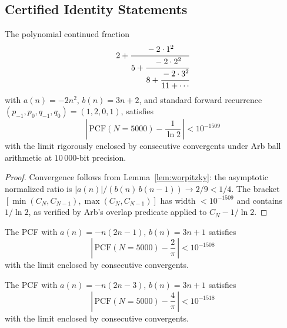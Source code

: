 
\subsection{Certified Identity Statements}

\begin{theorem}[Certified Log Family, $k=2$]\label{thm:ln2}
The polynomial continued fraction
\[
  2 + \cfrac{-2 \cdot 1^2}{5 + \cfrac{-2 \cdot 2^2}{8 + \cfrac{-2 \cdot 3^2}{11 + \cdots}}}
\]
with $a(n) = -2n^2$, $b(n) = 3n + 2$, and standard forward recurrence
$(p_{-1}, p_0, q_{-1}, q_0) = (1, 2, 0, 1)$, satisfies
\[
  \left|\, \mathrm{PCF}(N{=}5000) - \frac{1}{\ln 2}\, \right|
  < 10^{-1509}
\]
with the limit rigorously enclosed by consecutive convergents under
Arb ball arithmetic at $10\,000$-bit precision.
\end{theorem}

\begin{proof}
Convergence follows from Lemma~\ref{lem:worpitzky}: the asymptotic
normalized ratio is $|a(n)|/(b(n)\,b(n{-}1)) \to 2/9 < 1/4$.
The bracket $[\min(C_N, C_{N-1}), \max(C_N, C_{N-1})]$ has width
$< 10^{-1509}$ and contains $1/\ln 2$,
as verified by Arb's overlap predicate applied to $C_N - 1/\ln 2$.
\end{proof}

\begin{theorem}[Certified Pi Family, $m=0$]\label{thm:2overpi}
The PCF with $a(n) = -n(2n{-}1)$, $b(n) = 3n + 1$ satisfies
\[
  \left|\, \mathrm{PCF}(N{=}5000) - \frac{2}{\pi}\, \right|
  < 10^{-1508}
\]
with the limit enclosed by consecutive convergents.
\end{theorem}

\begin{theorem}[Certified Pi Family, $m=1$]\label{thm:4overpi}
The PCF with $a(n) = -n(2n{-}3)$, $b(n) = 3n + 1$ satisfies
\[
  \left|\, \mathrm{PCF}(N{=}5000) - \frac{4}{\pi}\, \right|
  < 10^{-1518}
\]
with the limit enclosed by consecutive convergents.
\end{theorem}
